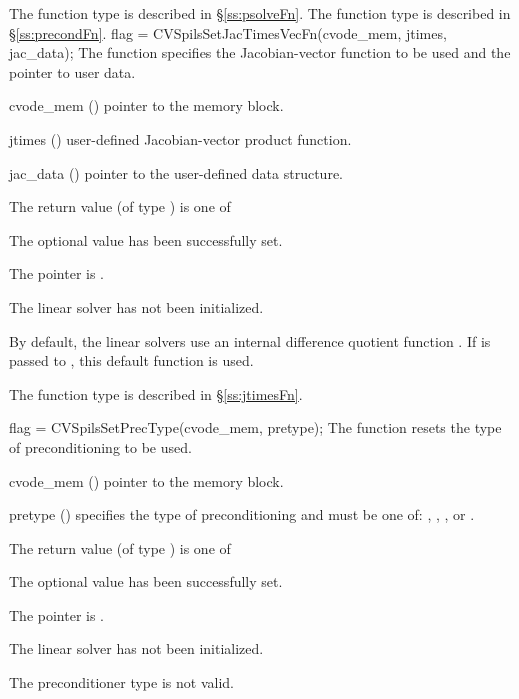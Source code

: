 {
   The function type  is described in \S\ref{ss:psolveFn}.
   The function type  is described in \S\ref{ss:precondFn}.
}
{
  flag = CVSpilsSetJacTimesVecFn(cvode\_mem, jtimes, jac\_data);
}
{
  The function  specifies the Jacobian-vector 
  function to be used and the pointer to user data.
}
{
  \begin{args}
  \item[cvode\_mem] ()
    pointer to the {\cvode} memory block.
  \item[jtimes] ()
    user-defined Jacobian-vector product function.
  \item[jac\_data] ()
     pointer to the user-defined data structure.
  \end{args}
}
{
  The return value  (of type ) is one of
  \begin{args}
  \item[\Id{CVSPILS\_SUCCESS}] 
    The optional value has been successfully set.
  \item[\Id{CVSPILS\_MEM\_NULL}]
    The  pointer is .
  \item[\Id{CVSPILS\_LMEM\_NULL}]
    The {\cvspils} linear solver has not been initialized.
  \end{args}
}
{
  By default, the {\cvspils} linear solvers use an internal difference quotient 
  function .
  If  is passed to , this default function is used.

  The function type  is described in \S\ref{ss:jtimesFn}.
}
{
  flag = CVSpilsSetPrecType(cvode\_mem, pretype);
}
{
  The function  resets the type
  of preconditioning to be used.
}
{
  \begin{args}
  \item[cvode\_mem] ()
    pointer to the {\cvode} memory block.
  \item[pretype] ()
    specifies the type of preconditioning and must be one of:
    , , , or .
  \end{args}
}
{
  The return value  (of type ) is one of
  \begin{args}
  \item[\Id{CVSPILS\_SUCCESS}] 
    The optional value has been successfully set.
  \item[\Id{CVSPILS\_MEM\_NULL}]
    The  pointer is .
  \item[\Id{CVSPILS\_LMEM\_NULL}]
    The {\cvspils} linear solver has not been initialized.
  \item[\Id{CVSPILS\_ILL\_INPUT}]
    The preconditioner type  is not valid.
  \end{args}
}
